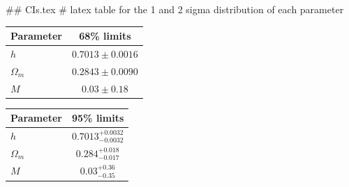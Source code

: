 ## CIs.tex
# latex table for the 1 and 2 sigma distribution of each parameter

\begin{tabular} { l  c}
 Parameter &  68\% limits\\
\hline
{\boldmath$h              $} & $0.7013\pm 0.0016          $\\
{\boldmath$\Omega_m       $} & $0.2843\pm 0.0090          $\\
{\boldmath$M              $} & $0.03\pm 0.18              $\\
\hline
\end{tabular}

\begin{tabular} { l  c}
 Parameter &  95\% limits\\
\hline
{\boldmath$h              $} & $0.7013^{+0.0032}_{-0.0032}$\\
{\boldmath$\Omega_m       $} & $0.284^{+0.018}_{-0.017}   $\\
{\boldmath$M              $} & $0.03^{+0.36}_{-0.35}      $\\
\hline
\end{tabular}
